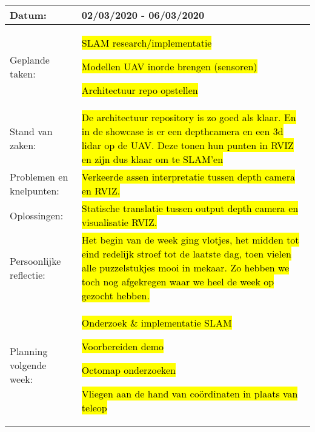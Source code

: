 \begin{tabularx}{\textwidth}{| l | X |}
  \hline
  Datum: & 02/03/2020 - 06/03/2020\\
  \hline
  Geplande taken: &
  \begin{compactitem}
    \item \hl{SLAM research/implementatie}
    \item \hl{Modellen UAV inorde brengen (sensoren)}
    \item \hl{Architectuur repo opstellen}
  \end{compactitem}\\
  \hline
  Stand van zaken: & \hl{De architectuur repository is zo goed als klaar. En in de showcase is er een depthcamera en een 3d lidar op de UAV. Deze tonen hun punten in RVIZ en zijn dus klaar om te SLAM'en}\\
  \hline
  Problemen en knelpunten: & \hl{Verkeerde assen interpretatie tussen depth camera en RVIZ.}\\
  \hline
  Oplossingen: & \hl{Statische translatie tussen output depth camera en visualisatie RVIZ.}\\
  \hline
  Persoonlijke reflectie: & \hl{Het begin van de week ging vlotjes, het midden tot eind redelijk stroef tot de laatste dag, toen vielen alle puzzelstukjes mooi in mekaar. Zo hebben we toch nog afgekregen waar we heel de week op gezocht hebben.}\\
  \hline
  Planning volgende week: & 
  \begin{compactitem}
    \item \hl{Onderzoek \& implementatie SLAM}
    \item \hl{Voorbereiden demo}
    \item \hl{Octomap onderzoeken}
    \item \hl{Vliegen aan de hand van co\"ordinaten in plaats van teleop}
  \end{compactitem}\\
  \hline
\end{tabularx}
